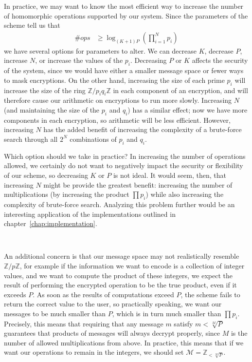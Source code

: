 \documentclass[11pt]{report}
\newcommand{\Z}{\mathbb{Z}}
\newcommand{\M}{\mathcal{M}}
\newcommand{\Zp}{\mathbb{Z}/p\mathbb{Z}}
\begin{document}
In practice, we may want to know the most efficient way to increase the number of homomorphic operations supported by our system. Since the parameters of the scheme tell us that
\begin{align*}
\#ops &\geq \log_{(K+1)P}\left(\prod_{i=1}^N p_i\right)
\end{align*}
we have several options for parameters to alter. We can decrease $K$, decrease $P$, increase $N$, or increase the values of the $p_i$. Decreasing $P$ or $K$ affects the security of the system, since we would have either a smaller message space or fewer ways to mask encryptions. On the other hand, increasing the size of each prime $p_i$ will increase the size of the ring $\Z/p_iq_i\Z$ in each component of an encryption, and will therefore cause our arithmetic on encryptions to run more slowly. Increasing $N$ (and maintaining the size of the $p_i$ and $q_i$) has a similar effect; now we have more components in each encryption, so arithmetic will be less efficient. However, increasing $N$ has the added benefit of increasing the complexity of a brute-force search through all $2^N$ combinations of $p_i$ and $q_i$.

Which option should we take in practice? In increasing the number of operations allowed, we certainly do not want to negatively impact the security or flexibility of our scheme, so decreasing $K$ or $P$ is not ideal. It would seem, then, that increasing $N$ might be provide the greatest benefit: increasing the number of multiplications (by increasing the product $\prod p_i$) while also increasing the complexity of brute-force search. Analyzing this problem further would be an interesting application of the implementations outlined in chapter~\ref{chap:implementation}.

\

An additional concern is that our message space may not realistically resemble $\Zp$, for example if the information we want to encode is a collection of integer values, and we want to compute the product of these integers, we expect the result of performing the encrypted operation to be the true product, even if it exceeds $P$. As soon as the results of computations exceed $P$, the scheme fails to return the correct value to the user, so practically speaking, we want our messages to be much smaller than $P$, which is in turn much smaller than $\prod p_i$. Precisely, this means that requiring that any message $m$ satisfy $m<\sqrt[M]{P}$ guarantees that products of messages will always decrypt properly, since $M$ is the number of allowed multiplications from above. In practice, this means that if we want our operations to remain in the integers, we should set $\M = \Z_{<\sqrt[M]{P}}$.
\end{document}
